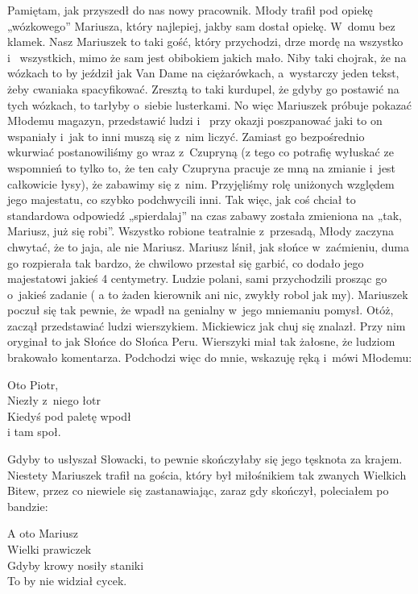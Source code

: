 Pamiętam, jak przyszedł do nas nowy pracownik. Młody trafił pod opiekę „wózkowego” Mariusza, który najlepiej, jakby 
sam dostał opiekę. W~domu bez klamek. Nasz Mariuszek to taki gość, który przychodzi, drze mordę na wszystko i~
wszystkich, mimo że sam jest obibokiem jakich mało. Niby taki chojrak, że na wózkach to by jeździł jak Van Dame na 
ciężarówkach, a~wystarczy jeden tekst, żeby cwaniaka spacyfikować. Zresztą to taki kurdupel, że gdyby go postawić na 
tych wózkach, to tarłyby o~siebie lusterkami. No więc Mariuszek próbuje pokazać Młodemu magazyn, przedstawić ludzi i~
przy okazji poszpanować jaki to on wspaniały i~jak to inni muszą się z~nim liczyć. Zamiast go bezpośrednio wkurwiać 
postanowiliśmy go wraz z~Czupryną (z tego co potrafię wyłuskać ze wspomnień to tylko to, że ten cały Czupryna pracuje 
ze mną na zmianie i~jest całkowicie łysy), że zabawimy się z~nim. Przyjęliśmy rolę uniżonych względem jego majestatu, 
co szybko podchwycili inni. Tak więc, jak coś chciał to standardowa odpowiedź „spierdalaj” na czas zabawy została 
zmieniona na „tak, Mariusz, już się robi”. Wszystko robione teatralnie z~przesadą, Młody zaczyna chwytać, że to jaja, 
ale nie Mariusz. Mariusz lśnił, jak słońce w~zaćmieniu, duma go rozpierała tak bardzo, że chwilowo przestał się 
garbić, co dodało jego majestatowi jakieś 4 centymetry. Ludzie polani, sami przychodzili prosząc go o~jakieś zadanie (
a to żaden kierownik ani nic, zwykły robol jak my). Mariuszek poczuł się tak pewnie, że wpadł na genialny w~jego 
mniemaniu pomysł. Otóż, zaczął przedstawiać ludzi wierszykiem. Mickiewicz jak chuj się znalazł. Przy nim oryginał to 
jak Słońce do Słońca Peru. Wierszyki miał tak żałosne, że ludziom brakowało komentarza. Podchodzi więc do mnie, 
wskazuję ręką i~mówi Młodemu:

\begin{itquote}
Oto Piotr,\\
Niezły z~niego łotr\\
Kiedyś pod paletę wpodł\\
i tam społ.\\
\end{itquote}

Gdyby to usłyszał Słowacki, to pewnie skończyłaby się jego tęsknota za krajem. Niestety Mariuszek trafił na gościa, 
który był miłośnikiem tak zwanych Wielkich Bitew, przez co niewiele się zastanawiając, zaraz gdy skończył, poleciałem 
po bandzie:

\begin{itquote}
A oto Mariusz\\
Wielki prawiczek\\
Gdyby krowy nosiły staniki\\
To by nie widział cycek.\\
\end{itquote}

